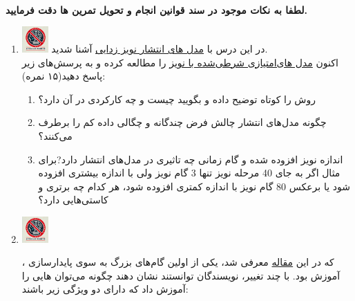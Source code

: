 \documentclass[12pt]{article}
\begin{document}
\fontsize{12pt}{14pt}\selectfont



\\
{\fontsize{14}{22}\selectfont \textbf{لطفا به نکات موجود در سند قوانین انجام و تحویل تمرین ها دقت فرمایید. }}

\begin{enumerate}

    \section*{سوالات تئوری}
    \item \includegraphics[width=1cm]{figs/Forbidden_AI.jpg}
    در این درس با \href{https://arxiv.org/pdf/2006.11239}{مدل های انتشار نویز زدایی} آشنا شدید.\\
    اکنون \href{https://arxiv.org/pdf/2006.09011}{مدل های‌امتیازی شرطی‌شده با نویز} را مطالعه کرده و به پرسش‌های زیر پاسخ دهید(۱۵ نمره):
    
    \begin{enumerate}
        \item روش را کوتاه توضیح داده و بگویید  چیست و چه کارکردی در آن دارد؟
        \item چگونه مدل‌های انتشار چالش فرض چندگانه و چگالی داده کم را برطرف می‌کنند؟
        \item 
    اندازه نویز افزوده شده و گام زمانی چه تاثیری در مدل‌های انتشار دارد?برای مثال اگر به جای 40 مرحله نویز تنها 3 گام نویز ولی با اندازه بیشتری افزوده شود یا برعکس 80 گام نویز با اندازه کمتری افزوده شود، هر کدام چه برتری و کاستی‌هایی دارد؟
    \end{enumerate}

     
    \item \includegraphics[width=1cm]{figs/Forbidden_AI.jpg}
    
    ، که در این \href{https://arxiv.org/pdf/1701.07875}{مقاله} معرفی شد، یکی از اولین گام‌های بزرگ به سوی پایدارسازی آموزش  بود. با چند تغییر، نویسندگان توانستند نشان دهند چگونه می‌توان  هایی را آموزش داد که دارای دو ویژگی زیر باشند:
    

\end{enumerate}
\end{document}
